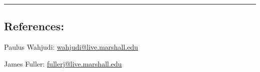 \documentclass[10pt,letterpaper]{article}
\newenvironment{indentsection}[1]%
{\begin{list}{}%
	{\setlength{\leftmargin}{#1}}%
	\item[]%
}
{\end{list}}
\begin{document}
\hrule
\vspace{-0.4em}
\subsection*{References:}

\begin{indentsection}{\parindent}
\begin{description*}
	\item[Paulus Wahjudi:]
	\href{mailto:wahjudi@live.marshall.edu}{wahjudi@live.marshall.edu}
	\item[James Fuller:]
	\href{mailto:fullerj@live.marshall.edu}{fullerj@live.marshall.edu}
\end{description*}
\end{indentsection}
\end{document}
